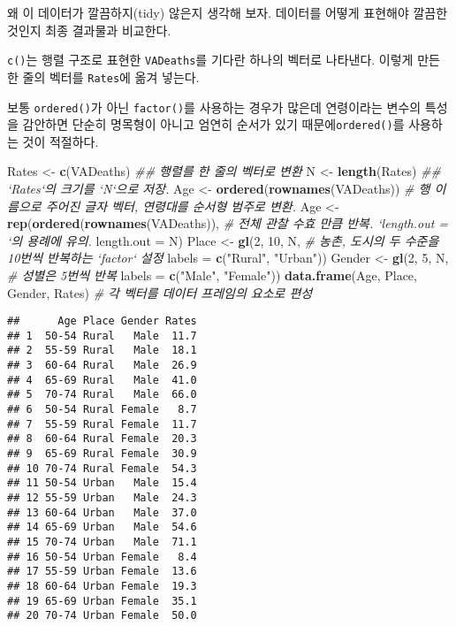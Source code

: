 \documentclass[
]{article}
\newenvironment{Shaded}{\begin{snugshade}}{\end{snugshade}}
\newcommand{\CommentTok}[1]{\textcolor[rgb]{0.56,0.35,0.01}{\textit{#1}}}
\newcommand{\DataTypeTok}[1]{\textcolor[rgb]{0.13,0.29,0.53}{#1}}
\newcommand{\DecValTok}[1]{\textcolor[rgb]{0.00,0.00,0.81}{#1}}
\newcommand{\KeywordTok}[1]{\textcolor[rgb]{0.13,0.29,0.53}{\textbf{#1}}}
\newcommand{\NormalTok}[1]{#1}
\newcommand{\StringTok}[1]{\textcolor[rgb]{0.31,0.60,0.02}{#1}}
\begin{document}
왜 이 데이터가 깔끔하지(tidy) 않은지 생각해 보자. 데이터를 어떻게
표현해야 깔끔한 것인지 최종 결과물과 비교한다.

\texttt{c()}는 행렬 구조로 표현한 \texttt{VADeaths}를 기다란 하나의
벡터로 나타낸다. 이렇게 만든 한 줄의 벡터를 \texttt{Rates}에 옮겨
넣는다.

보통 \texttt{ordered()}가 아닌 \texttt{factor()}를 사용하는 경우가
많은데 연령이라는 변수의 특성을 감안하면 단순히 명목형이 아니고 엄연히
순서가 있기 때문에\texttt{ordered()}를 사용하는 것이 적절하다.

\begin{Shaded}
\begin{Highlighting}[]
\NormalTok{Rates <-}\StringTok{ }\KeywordTok{c}\NormalTok{(VADeaths)  }\CommentTok{## 행렬를 한 줄의 벡터로 변환 }
\NormalTok{N <-}\StringTok{ }\KeywordTok{length}\NormalTok{(Rates) }\CommentTok{## `Rates`의 크기를 `N`으로 저장.}
\NormalTok{Age <-}\StringTok{ }\KeywordTok{ordered}\NormalTok{(}\KeywordTok{rownames}\NormalTok{(VADeaths)) }\CommentTok{# 행 이름으로 주어진 글자 벡터, 연령대를 순서형 범주로 변환. }
\NormalTok{Age <-}\StringTok{ }\KeywordTok{rep}\NormalTok{(}\KeywordTok{ordered}\NormalTok{(}\KeywordTok{rownames}\NormalTok{(VADeaths)), }\CommentTok{# 전체 관찰 수효 만큼 반복. `length.out = `의 용례에 유의. }
           \DataTypeTok{length.out =}\NormalTok{ N)}
\NormalTok{Place <-}\StringTok{ }\KeywordTok{gl}\NormalTok{(}\DecValTok{2}\NormalTok{, }\DecValTok{10}\NormalTok{, N, }\CommentTok{# 농촌, 도시의 두 수준을 10번씩 반복하는 `factor` 설정}
           \DataTypeTok{labels =} \KeywordTok{c}\NormalTok{(}\StringTok{"Rural"}\NormalTok{, }\StringTok{"Urban"}\NormalTok{))}
\NormalTok{Gender <-}\StringTok{ }\KeywordTok{gl}\NormalTok{(}\DecValTok{2}\NormalTok{, }\DecValTok{5}\NormalTok{, N, }\CommentTok{# 성별은 5번씩 반복 }
             \DataTypeTok{labels =} \KeywordTok{c}\NormalTok{(}\StringTok{"Male"}\NormalTok{, }\StringTok{"Female"}\NormalTok{))}
\KeywordTok{data.frame}\NormalTok{(Age, Place, Gender, Rates) }\CommentTok{# 각 벡터를 데이터 프레임의 요소로 편성}
\end{Highlighting}
\end{Shaded}

\begin{verbatim}
##      Age Place Gender Rates
## 1  50-54 Rural   Male  11.7
## 2  55-59 Rural   Male  18.1
## 3  60-64 Rural   Male  26.9
## 4  65-69 Rural   Male  41.0
## 5  70-74 Rural   Male  66.0
## 6  50-54 Rural Female   8.7
## 7  55-59 Rural Female  11.7
## 8  60-64 Rural Female  20.3
## 9  65-69 Rural Female  30.9
## 10 70-74 Rural Female  54.3
## 11 50-54 Urban   Male  15.4
## 12 55-59 Urban   Male  24.3
## 13 60-64 Urban   Male  37.0
## 14 65-69 Urban   Male  54.6
## 15 70-74 Urban   Male  71.1
## 16 50-54 Urban Female   8.4
## 17 55-59 Urban Female  13.6
## 18 60-64 Urban Female  19.3
## 19 65-69 Urban Female  35.1
## 20 70-74 Urban Female  50.0
\end{verbatim}
\end{document}
